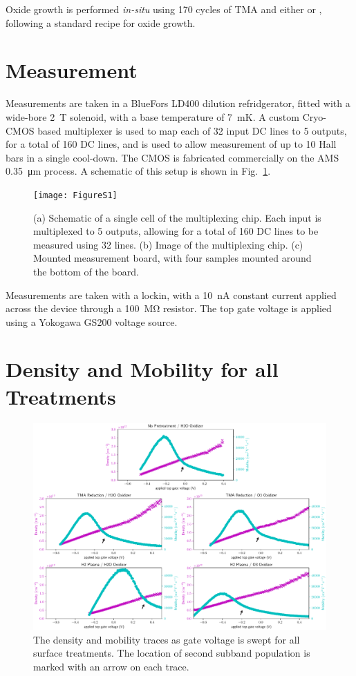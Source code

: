 Oxide growth is performed \emph{in-situ} using 170 cycles of TMA and either  or , following a standard recipe for oxide growth.

\clearpage
\section{Measurement}
\label{sec:surf_mulberry}
Measurements are taken in a BlueFors LD400 dilution refridgerator, fitted with a wide-bore \SI{2}{\tesla} solenoid, with a base temperature of \SI{7}{\milli\kelvin}. A custom Cryo-CMOS based multiplexer is used to map each of 32 input DC lines to 5 outputs, for a total of 160 DC lines, and is used to allow measurement of up to 10 Hall bars in a single cool-down. The CMOS is fabricated commercially on the AMS \SI{0.35}{\micro\meter} process. A schematic of this setup is shown in Fig.~\ref{fig:surf_cmos}.

\begin{figure}
    \texttt{[image: FigureS1]}
    \caption[Measurement multiplexing setup]{(a) Schematic of a single cell of the multiplexing chip. Each input is multiplexed to 5 outputs, allowing for a total of 160 DC lines to be measured using 32 lines. (b) Image of the multiplexing chip. (c) Mounted measurement board, with four samples mounted around the bottom of the board.}
    \label{fig:surf_cmos}
\end{figure}

Measurements are taken with a lockin, with a \SI{10}{\nano\ampere} constant current applied across the device through a \SI{100}{\mega\ohm} resistor. The top gate voltage is applied using a Yokogawa GS200 voltage source.

\clearpage
\section{Density and Mobility for all Treatments}
\label{sec:all_treat}
\begin{figure}[h]
    \includegraphics[width=\linewidth]{FigureS3}
    \caption[Density/Mobility for all Treatments]{The density and mobility traces as gate voltage is swept for all surface treatments. The location of second subband population is marked with an arrow on each trace.}
    \label{fig:surf_allt}
\end{figure}

